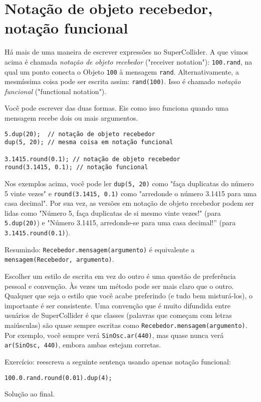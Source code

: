 \section{Notação de objeto recebedor, notação funcional}


Há mais de uma maneira de escrever expressões no SuperCollider. A que vimos acima é chamada \emph{notação de objeto recebedor} ("receiver notation"): \texttt{100.rand}, na qual um ponto conecta o Objeto \texttt{100} à mensagem \texttt{rand}. Alternativamente, a mesmíssima coisa pode ser escrita assim: \texttt{rand(100)}. Isso é chamado \emph{notação funcional} ("functional notation").

Você pode escrever das duas formas. Eis  como isso funciona quando uma mensagem recebe dois ou mais argumentos.

 
\begin{lstlisting}[style=SuperCollider-IDE, basicstyle=\scttfamily\footnotesize]
5.dup(20);  // notação de objeto recebedor
dup(5, 20); // mesma coisa em notação funcional

3.1415.round(0.1); // notação de objeto recebedor
round(3.1415, 0.1); // notação funcional
\end{lstlisting}
 

Nos exemplos acima, você pode ler \texttt{dup(5, 20)} como "faça duplicatas do número 5 vinte vezes" e \texttt{round(3.1415, 0.1)} como "arredonde o número 3.1415 para uma casa decimal". Por sua vez, as versões em notação de objeto recebedor podem ser lidas como "Número 5, faça duplicatas de si mesmo vinte vezes!" (para \texttt{5.dup(20)}) e "Número 3.1415, arredonde-se para uma casa decimal!'' (para \texttt{3.1415.round(0.1)}).

Resumindo: \texttt{Recebedor.mensagem(argumento)} é equivalente a \texttt{mensagem(Recebedor, argumento)}.

Escolher um estilo de escrita em vez do outro é uma questão de preferência pessoal e convenção. Às vezes um método pode ser mais claro que o outro. Qualquer que seja o estilo que você acabe preferindo (e tudo bem misturá-los), o importante é ser consistente. Uma convenção que é muito difundida entre usuários de SuperCollider é que classes (palavras que começam com letras maiúsculas) são quase sempre escritas como \texttt{Recebedor.mensagem(argumento)}. Por exemplo, você sempre verá \texttt{SinOsc.ar(440)}, mas quase nunca verá \texttt{ar(SinOsc, 440)}, embora ambas estejam corretas.

Exercício: reescreva a seguinte sentença usando apenas notação funcional:

\texttt{100.0.rand.round(0.01).dup(4);} 

Solução ao final.
